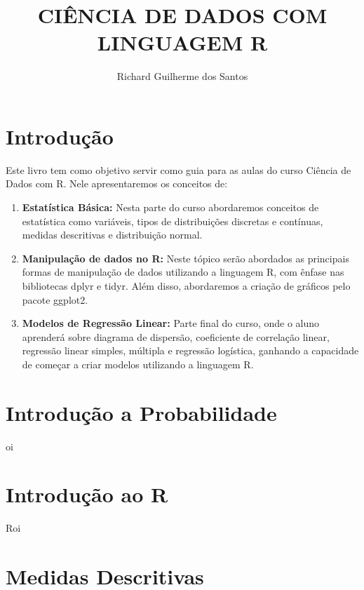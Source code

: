 \documentclass[
]{book}
\title{CIÊNCIA DE DADOS COM LINGUAGEM R}
\author{Richard Guilherme dos Santos}
\date{}
\providecommand{\tightlist}{%
  \setlength{\itemsep}{0pt}\setlength{\parskip}{0pt}}
\begin{document}
\maketitle

{
\setcounter{tocdepth}{1}
\tableofcontents
}
\hypertarget{introduuxe7uxe3o}{%
\chapter{Introdução}\label{introduuxe7uxe3o}}

Este livro tem como objetivo servir como guia para as aulas do curso Ciência de Dados com R. Nele apresentaremos os conceitos de:

\begin{enumerate}
\def\labelenumi{\arabic{enumi}.}
\tightlist
\item
  \textbf{Estatística Básica:} Nesta parte do curso abordaremos conceitos de estatística como variáveis, tipos de distribuições discretas e contínuas, medidas descritivas e distribuição normal.
\item
  \textbf{Manipulação de dados no R:} Neste tópico serão abordados as principais formas de manipulação de dados utilizando a linguagem R, com ênfase nas bibliotecas dplyr e tidyr. Além disso, abordaremos a criação de gráficos pelo pacote ggplot2.
\item
  \textbf{Modelos de Regressão Linear:} Parte final do curso, onde o aluno aprenderá sobre diagrama de dispersão, coeficiente de correlação linear, regressão linear simples, múltipla e regressão logística, ganhando a capacidade de começar a criar modelos utilizando a linguagem R.
\end{enumerate}

\hypertarget{introduuxe7uxe3o-a-probabilidade}{%
\chapter{Introdução a Probabilidade}\label{introduuxe7uxe3o-a-probabilidade}}

oi

\hypertarget{introduuxe7uxe3o-ao-r}{%
\chapter{Introdução ao R}\label{introduuxe7uxe3o-ao-r}}

Roi

\hypertarget{medidas-descritivas}{%
\chapter{Medidas Descritivas}\label{medidas-descritivas}}
\end{document}

